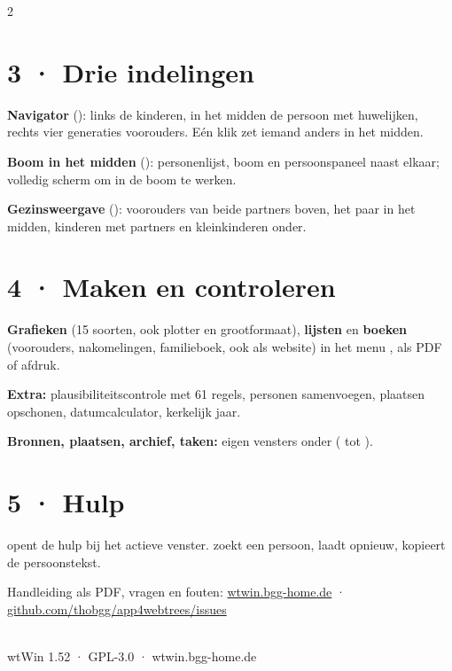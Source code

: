 \documentclass[a4paper, 9.5pt, parskip=half]{scrartcl}
\begin{document}
\begin{multicols}{2}
\section*{3 · Drie indelingen}
\textbf{Navigator} (): links de kinderen, in het midden de persoon met huwelijken, rechts vier generaties voorouders. Eén klik zet iemand anders in het midden.

\textbf{Boom in het midden} (): personenlijst, boom en persoonspaneel naast elkaar; volledig scherm om in de boom te werken.

\textbf{Gezinsweergave} (): voorouders van beide partners boven, het paar in het midden, kinderen met partners en kleinkinderen onder.
\section*{4 · Maken en controleren}
\textbf{Grafieken} (15 soorten, ook plotter en grootformaat), \textbf{lijsten} en \textbf{boeken} (voorouders, nakomelingen, familieboek, ook als website) in het menu , als PDF of afdruk.

\textbf{Extra:} plausibiliteitscontrole met 61 regels, personen samenvoegen, plaatsen opschonen, datumcalculator, kerkelijk jaar.

\textbf{Bronnen, plaatsen, archief, taken:} eigen vensters onder  ( tot ).
\section*{5 · Hulp}
 opent de hulp bij het actieve venster.  zoekt een persoon,  laadt opnieuw,  kopieert de persoonstekst.

Handleiding als PDF, vragen en fouten: \href{https://wtwin.bgg-home.de}{wtwin.bgg-home.de} · \href{https://github.com/thobgg/app4webtrees/issues}{github.com/thobgg/app4webtrees/issues}
\vspace{3mm}
\noindent{}
\end{multicols}
\vspace{2mm}
\noindent{\color{wtLinie}\rule{\linewidth}{0.5pt}}\\[2pt]
{\sffamily\footnotesize\color{wtGrau}wtWin 1.52 · GPL-3.0 · wtwin.bgg-home.de}
\end{document}
